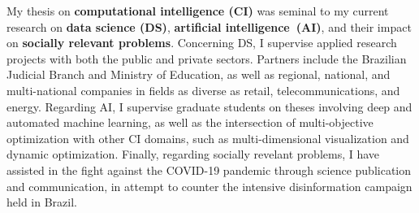 My thesis on \textbf{computational intelligence (CI)} was seminal to my current research on \textbf{data science (DS)}, \textbf{artificial intelligence~(AI)}, and their impact on \textbf{socially relevant problems}. Concerning DS, I supervise applied research projects with both the public and private sectors. Partners include the Brazilian Judicial Branch and Ministry of Education, as well as regional, national, and multi-national companies in fields as diverse as retail, telecommunications, and energy. Regarding AI, I supervise graduate students on theses involving deep and automated machine learning, as well as the intersection of multi-objective optimization with other CI domains, such as multi-dimensional visualization and dynamic optimization. Finally, regarding socially revelant problems, I have assisted in the fight against the COVID-19 pandemic through science publication and communication, in attempt to counter the intensive disinformation campaign held in Brazil. 





